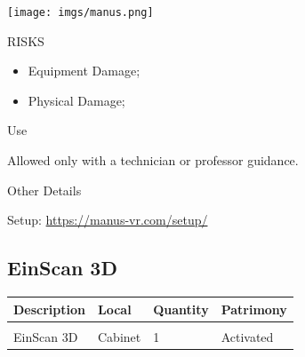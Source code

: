\begin{multicols}{2}

\texttt{[image: imgs/manus.png]}

\columnbreak

\begin{mdframed}[roundcorner=10pt, linecolor=red, linewidth=2pt]
\vspace{1em}
{\Large {\color{red}RISKS}}
\vspace{1em}

\begin{itemize}
    \item Equipment Damage;
    \item Physical Damage;
\end{itemize}

\vspace{1em}
\end{mdframed}

\vspace{2em}

{\Large Use}
\vspace{1em}

Allowed only with a technician or professor guidance.
\end{multicols}

{\Large Other Details}
\vspace{1em}

Setup: \url{https://manus-vr.com/setup/}
\newpage


\subsection{EinScan 3D}
\begin{tabularx}{\textwidth}{ Y  Y  Y  Y }
    \textbf{Description} &  \textbf{Local} &  \textbf{Quantity} & \textbf{Patrimony}\\
    \hline \\
     EinScan 3D & Cabinet& 1 & Activated
\end{tabularx}
\vspace{1cm}

